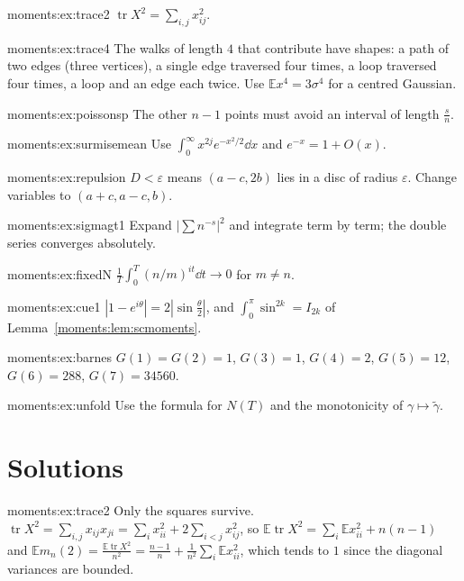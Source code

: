 \begin{hint}{moments:ex:trace2}
$\operatorname{tr}X^2=\sum_{i,j}x_{ij}^2$.
\end{hint}
\begin{hint}{moments:ex:trace4}
The walks of length $4$ that contribute have shapes: a path of two edges (three vertices), a single edge traversed four times, a loop traversed four times, a loop and an edge each twice.
Use $\mathbb Ex^4=3\sigma^4$ for a centred Gaussian.
\end{hint}
\begin{hint}{moments:ex:poissonsp}
The other $n-1$ points must avoid an interval of length $\frac sn$.
\end{hint}
\begin{hint}{moments:ex:surmisemean}
Use $\int_0^\infty x^{2j}e^{-x^2/2}\dd x$ and $e^{-x}=1+O(x)$.
\end{hint}
\begin{hint}{moments:ex:repulsion}
$D<\varepsilon$ means $(a-c,2b)$ lies in a disc of radius $\varepsilon$. Change variables to $(a+c,a-c,b)$.
\end{hint}
\begin{hint}{moments:ex:sigmagt1}
Expand $|\sum n^{-s}|^2$ and integrate term by term; the double series converges absolutely.
\end{hint}
\begin{hint}{moments:ex:fixedN}
$\frac1T\int_0^T(n/m)^{it}\dd t\to0$ for $m\ne n$.
\end{hint}
\begin{hint}{moments:ex:cue1}
$|1-e^{i\theta}|=2|\sin\frac\theta2|$, and $\int_0^\pi\sin^{2k}=I_{2k}$ of Lemma~\ref{moments:lem:scmoments}.
\end{hint}
\begin{hint}{moments:ex:barnes}
$G(1)=G(2)=1$, $G(3)=1$, $G(4)=2$, $G(5)=12$, $G(6)=288$, $G(7)=34560$.
\end{hint}
\begin{hint}{moments:ex:unfold}
Use the formula for $N(T)$ and the monotonicity of $\gamma\mapsto\tilde\gamma$.
\end{hint}

\section{Solutions}

\begin{solution}{moments:ex:trace2}
\idea Only the squares survive.
\writeup $\operatorname{tr}X^2=\sum_{i,j}x_{ij}x_{ji}=\sum_ix_{ii}^2+2\sum_{i<j}x_{ij}^2$, so $\mathbb E\operatorname{tr}X^2=\sum_i\mathbb Ex_{ii}^2+n(n-1)$ and
$\mathbb Em_n(2)=\frac{\mathbb E\operatorname{tr}X^2}{n^2}=\frac{n-1}n+\frac1{n^2}\sum_i\mathbb Ex_{ii}^2$, which tends to $1$ since the diagonal variances are bounded.
\end{solution}

